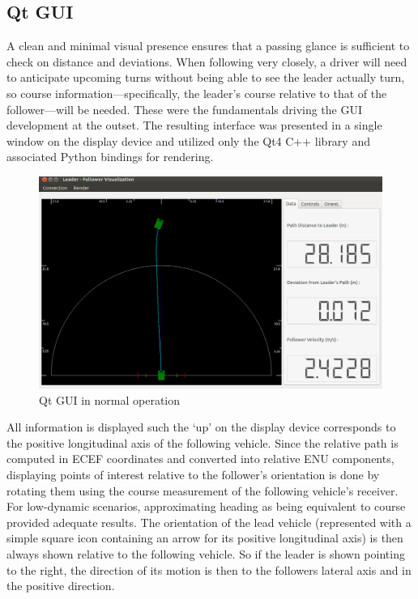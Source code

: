 \documentclass[twocolumn,10pt]{article}
\begin{document}
  \subsection*{Qt GUI}
  
    A clean and minimal visual presence ensures that a passing glance is sufficient to check on distance and deviations.  When following very closely, a driver will need to anticipate upcoming turns without being able to see the leader actually turn, so course information---specifically, the leader's course relative to that of the follower---will be needed.  These were the fundamentals driving the GUI development at the outset.  The resulting interface was presented in a single window on the display device and utilized only the Qt4 C++ library \cite{qt} and associated Python bindings for rendering.

    \begin{figure}[ht] \centering
      \includegraphics[width=\columnwidth] {../graphics/final_design_data.png}
      \caption{Qt GUI in normal operation}
      \label{fig:qt_normal}
    \end{figure}

    All information is displayed such the `up' on the display device corresponds to the positive longitudinal axis of the following vehicle.
    Since the relative path is computed in ECEF coordinates and converted into relative ENU components, displaying points of interest relative to the follower's orientation is done by rotating them using the course measurement of the following vehicle's receiver. For low-dynamic scenarios, approximating heading as being equivalent to course provided adequate results.
    The orientation of the lead vehicle (represented with a simple square icon containing an arrow for its positive longitudinal axis) is then always shown relative to the following vehicle.  So if the leader is shown pointing to the right, the direction of its motion is then to the followers lateral axis and in the positive direction. 
\end{document}
